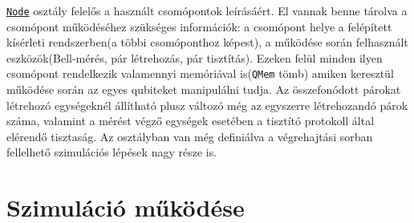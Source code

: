 \underline{\texttt{Node}} osztály felelős a használt csomópontok leírásáért. El vannak benne tárolva a csomópont működéséhez szükséges információk:  a csomópont helye a felépített kísérleti rendszerben(a többi csomóponthoz képest), a működése során felhasznált eszközök(Bell-mérés, pár létrehozás, pár tisztítás). Ezeken felül minden ilyen csomópont rendelkezik valamennyi memóriával is(\texttt{QMem} tömb) amiken keresztül működése során az egyes qubiteket manipulálni tudja. Az összefonódott párokat létrehozó egységeknél állítható plusz változó még az egyszerre létrehozandó párok száma, valamint a mérést végző egységek esetében a tisztító protokoll által elérendő tisztaság. Az osztályban van még definiálva a végrehajtási sorban fellelhető szimulációs lépések nagy része is.

\section{Szimuláció működése}

